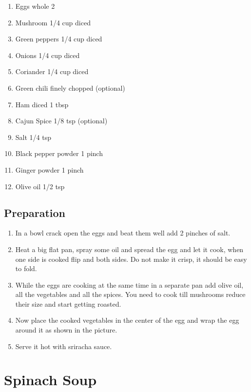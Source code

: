 \documentclass[
  oneside]{book}
\providecommand{\tightlist}{%
  \setlength{\itemsep}{0pt}\setlength{\parskip}{0pt}}
\begin{document}
\begin{enumerate}
\def\labelenumi{\arabic{enumi}.}
\tightlist
\item
  Eggs whole 2
\item
  Mushroom 1/4 cup diced
\item
  Green peppers 1/4 cup diced
\item
  Onions 1/4 cup diced
\item
  Coriander 1/4 cup diced
\item
  Green chili finely chopped (optional)
\item
  Ham diced 1 tbsp
\item
  Cajun Spice 1/8 tsp (optional)
\item
  Salt 1/4 tsp
\item
  Black pepper powder 1 pinch
\item
  Ginger powder 1 pinch
\item
  Olive oil 1/2 tsp
\end{enumerate}

\hypertarget{preparation-1}{%
\subsection{Preparation}\label{preparation-1}}

\begin{enumerate}
\def\labelenumi{\arabic{enumi}.}
\item
  In a bowl crack open the eggs and beat them well add 2 pinches of salt.
\item
  Heat a big flat pan, spray some oil and spread the egg and let it cook, when one side is cooked flip and both sides. Do not make it crisp, it should be easy to fold.
\item
  While the eggs are cooking at the same time in a separate pan add olive oil, all the vegetables and all the spices. You need to cook till mushrooms reduce their size and start getting roasted.
\item
  Now place the cooked vegetables in the center of the egg and wrap the egg around it as shown in the picture.
\item
  Serve it hot with sriracha sauce.
\end{enumerate}

\hypertarget{spinach-soup}{%
\section{Spinach Soup}\label{spinach-soup}}
\end{document}
